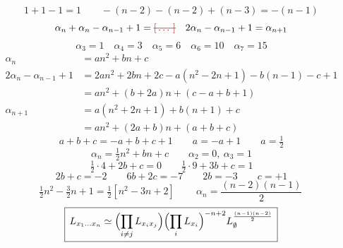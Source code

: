\documentclass[11pt,a4paper]{article}
\begin{document}
\[ 1 + 1 - 1 = 1 \qquad -(n-2) - (n-2) + (n-3) = -(n-1) \]
\[
\alpha_n + \alpha_n - \alpha_{n-1} + 1 = \text{\struck{\ill{}}}\quad 2\alpha_n - \alpha_{n-1} + 1 = \alpha_{n+1}
\]
\[
\alpha_3 = 1 \quad \alpha_4 = 3 \quad \alpha_5 = 6 \quad \alpha_6 = 10 \quad \alpha_7 = 15
\]
\begin{align*}
\alpha_n &= an^2 + bn + c \\
2\alpha_n - \alpha_{n-1} + 1 &= 2an^2 + 2bn + 2c - a(n^2 - 2n + 1) - b(n-1) - c + 1 \\
&= an^2 + (b + 2a)n + (c - a + b + 1) \\
\alpha_{n+1} &= a(n^2 + 2n + 1) + b(n+1) + c \\
&= an^2 + (2a + b)n + (a + b + c)
\end{align*}
\[
a + b + c = -a + b + c + 1 \qquad a = -a + 1 \qquad a = \tfrac12
\]
\[
\alpha_n = \tfrac12 n^2 + bn + c \qquad \alpha_2 = 0,\ \alpha_3 = 1
\]
\[
\tfrac12 \cdot 4 + 2b + c = 0 \qquad \tfrac12 \cdot 9 + 3b + c = 1
\]
\[
2b + c = -2 \qquad 6b + 2c = -7 \qquad 2b = -3 \qquad c = +1
\]
\[
\tfrac12 n^2 - \tfrac32 n + 1 = \tfrac12 [n^2 - 3n + 2]
\qquad
\boxed{\, \alpha_n = \frac{(n-2)(n-1)}{2} \,}
\]
\[
\boxed{\, L_{x_1 \dots x_n} \simeq \Bigl(\prod_{i \neq j} L_{x_i x_j}\Bigr) \Bigl(\prod_i L_{x_i}\Bigr)^{-n+2} L_{\emptyset}^{\frac{(n-1)(n-2)}{2}} \,}
\]
\end{document}
